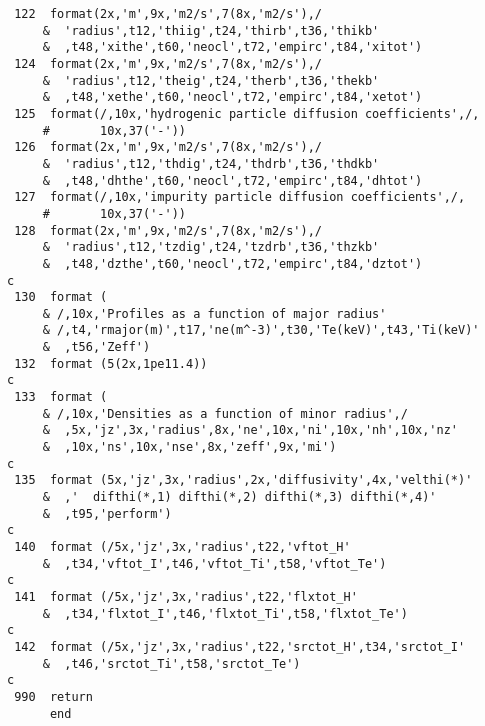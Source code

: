 \begin{verbatim}
 122  format(2x,'m',9x,'m2/s',7(8x,'m2/s'),/
     &  'radius',t12,'thiig',t24,'thirb',t36,'thikb'
     &  ,t48,'xithe',t60,'neocl',t72,'empirc',t84,'xitot')
 124  format(2x,'m',9x,'m2/s',7(8x,'m2/s'),/
     &  'radius',t12,'theig',t24,'therb',t36,'thekb'
     &  ,t48,'xethe',t60,'neocl',t72,'empirc',t84,'xetot')
 125  format(/,10x,'hydrogenic particle diffusion coefficients',/,
     #       10x,37('-'))
 126  format(2x,'m',9x,'m2/s',7(8x,'m2/s'),/
     &  'radius',t12,'thdig',t24,'thdrb',t36,'thdkb'
     &  ,t48,'dhthe',t60,'neocl',t72,'empirc',t84,'dhtot')
 127  format(/,10x,'impurity particle diffusion coefficients',/,
     #       10x,37('-'))
 128  format(2x,'m',9x,'m2/s',7(8x,'m2/s'),/
     &  'radius',t12,'tzdig',t24,'tzdrb',t36,'thzkb'
     &  ,t48,'dzthe',t60,'neocl',t72,'empirc',t84,'dztot')
c
 130  format (
     & /,10x,'Profiles as a function of major radius'
     & /,t4,'rmajor(m)',t17,'ne(m^-3)',t30,'Te(keV)',t43,'Ti(keV)'
     &  ,t56,'Zeff')
 132  format (5(2x,1pe11.4))
c
 133  format (
     & /,10x,'Densities as a function of minor radius',/
     &  ,5x,'jz',3x,'radius',8x,'ne',10x,'ni',10x,'nh',10x,'nz'
     &  ,10x,'ns',10x,'nse',8x,'zeff',9x,'mi')
c
 135  format (5x,'jz',3x,'radius',2x,'diffusivity',4x,'velthi(*)'
     &  ,'  difthi(*,1) difthi(*,2) difthi(*,3) difthi(*,4)'
     &  ,t95,'perform')
c
 140  format (/5x,'jz',3x,'radius',t22,'vftot_H'
     &  ,t34,'vftot_I',t46,'vftot_Ti',t58,'vftot_Te')
c
 141  format (/5x,'jz',3x,'radius',t22,'flxtot_H'
     &  ,t34,'flxtot_I',t46,'flxtot_Ti',t58,'flxtot_Te')
c
 142  format (/5x,'jz',3x,'radius',t22,'srctot_H',t34,'srctot_I'
     &  ,t46,'srctot_Ti',t58,'srctot_Te')
c
 990  return
      end
\end{verbatim}

